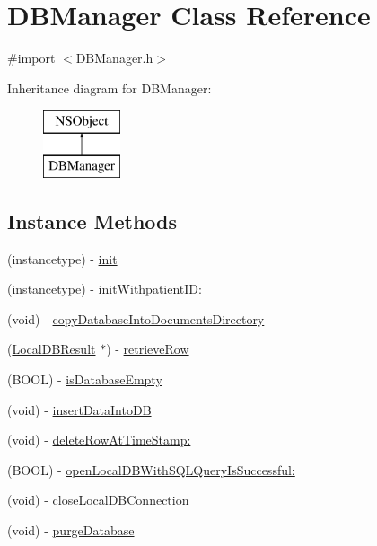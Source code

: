 \hypertarget{interface_d_b_manager}{\section{D\-B\-Manager Class Reference}
\label{interface_d_b_manager}
}


{\ttfamily \#import $<$D\-B\-Manager.\-h$>$}

Inheritance diagram for D\-B\-Manager\-:\begin{figure}[H]
\begin{center}
\leavevmode
\includegraphics[height=2.000000cm]{interface_d_b_manager}
\end{center}
\end{figure}
\subsection*{Instance Methods}
\begin{DoxyCompactItemize}
\item 
(instancetype) -\/ \hyperlink{interface_d_b_manager_a0b390c8eab2577c30b2012e14ae821fe}{init}
\item 
(instancetype) -\/ \hyperlink{interface_d_b_manager_a24ba5578b7bcfff67ad5fcffb6c05f7b}{init\-Withpatient\-I\-D\-:}
\item 
(void) -\/ \hyperlink{interface_d_b_manager_a2e49fe020ebf348c2768a4c4a3dcff00}{copy\-Database\-Into\-Documents\-Directory}
\item 
(\hyperlink{interface_local_d_b_result}{Local\-D\-B\-Result} $\ast$) -\/ \hyperlink{interface_d_b_manager_ad6723b4f6b2191eddbcc4bb9bd361fcb}{retrieve\-Row}
\item 
(B\-O\-O\-L) -\/ \hyperlink{interface_d_b_manager_a3c424eba24e9894922714f6154a6dc44}{is\-Database\-Empty}
\item 
(void) -\/ \hyperlink{interface_d_b_manager_a0c354ea19fc86923ba33e5dc32798ca8}{insert\-Data\-Into\-D\-B}
\item 
(void) -\/ \hyperlink{interface_d_b_manager_a28d37edd37bc78b35579d276b8abfd9b}{delete\-Row\-At\-Time\-Stamp\-:}
\item 
(B\-O\-O\-L) -\/ \hyperlink{interface_d_b_manager_ab93660b0ab1caac6cd83b9edc349ddee}{open\-Local\-D\-B\-With\-S\-Q\-L\-Query\-Is\-Successful\-:}
\item 
(void) -\/ \hyperlink{interface_d_b_manager_a768157b5a58c4e400ee1326fe804d2b8}{close\-Local\-D\-B\-Connection}
\item 
(void) -\/ \hyperlink{interface_d_b_manager_aa804a3f4200ce732321d814cf86dbd2b}{purge\-Database}
\end{DoxyCompactItemize}
